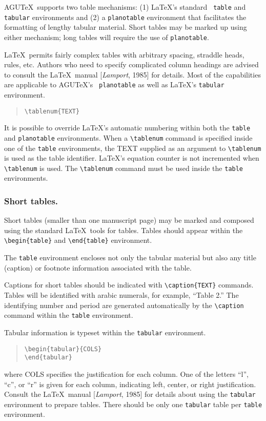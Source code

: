 AGU\TeX\ supports two table mechanisms: (1) \LaTeX's standard {\tt 
table} and {\tt tabular} environments and (2) a {\tt planotable} 
environment that facilitates the formatting of lengthy tabular 
material.  Short tables may be marked up using either mechanism; 
long tables will require the use of {\tt planotable}.

\LaTeX\ permits fairly complex tables with arbitrary spacing, straddle 
heads, rules, etc.  Authors who need to specify complicated column 
headings are advised to consult the \LaTeX\ manual [{\it Lamport}, 1985] 
for details.  Most of the capabilities are applicable to AGU\TeX's {\tt 
planotable} as well as \LaTeX's {\tt tabular} environment.

\begin{quote}
\verb"\tablenum{TEXT}"
\end{quote}

It is possible to override \LaTeX's automatic numbering within both the
{\tt table} and {\tt planotable} environments.  When a \verb"\tablenum" 
command is specified inside one of the {\tt table} environments, the 
{\small TEXT} supplied as an argument to \verb"\tablenum" is used as 
the table identifier.  \LaTeX's equation counter is not incremented 
when \verb"\tablenum" is used.  The \verb"\tablenum" command must be 
used inside the {\tt table} environments.

\subsubsection{Short tables.}
Short tables (smaller than one manuscript page) may be marked and 
composed using the standard \LaTeX\ tools for tables.  Tables should 
appear within the \verb"\begin{table}" and \verb"\end{table}" environment.

The {\tt table} environment encloses not only the tabular material but 
also any title (caption) or footnote information associated with the table.

Captions for short tables should be indicated with \verb"\caption{TEXT}" 
commands.  Tables will be identified with arabic numerals, for example, 
``Table 2.''  The identifying number and period are generated automatically 
by the \verb"\caption" command within the \verb"table" environment.

Tabular information is typeset within the {\tt tabular} environment.
\begin{quote}
\verb"\begin{tabular}{COLS}"\\
\verb"\end{tabular}"
\end{quote}
where {\small COLS} specifies the justification for each column.
One of the letters ``l'', ``c'', or ``r'' is given for each column,
indicating left, center, or right justification.  Consult the 
\LaTeX\ manual [{\it Lamport}, 1985] for details about using the 
{\tt tabular} environment to prepare tables.  There should be only 
one {\tt tabular} table per {\tt table} environment.  

